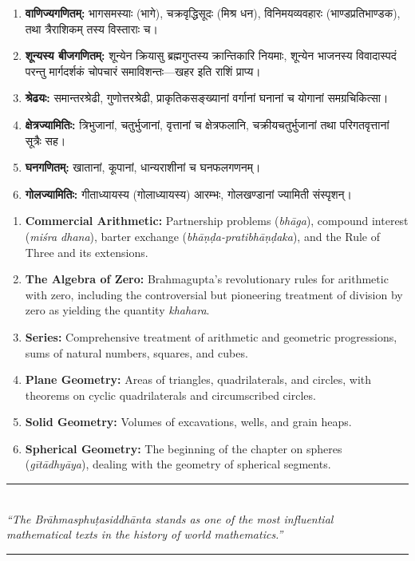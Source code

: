 \documentclass[10pt,a4paper]{article}
\newcommand{\dev}[1]{{\devanagarifont #1}}
\newcommand{\longline}{\noindent\rule{\textwidth}{0.4pt}}
\newcommand{\bilingual}[2]{%
  \noindent%
  \begin{minipage}[t]{0.47\textwidth}%
    \setstretch{1.15}#1%
  \end{minipage}%
  \hfill%
  \vrule\hfill%
  \begin{minipage}[t]{0.47\textwidth}%
    \setstretch{1.15}#2%
  \end{minipage}%
  \par\medskip
}
\begin{document}
\bilingual{%
\begin{enumerate}
\item \textbf{वाणिज्यगणितम्:} भागसमस्याः (\dev{भागे}), चक्रवृद्धिसूदः (\dev{मिश्र धन}), विनिमयव्यवहारः (\dev{भाण्डप्रतिभाण्डक}), तथा त्रैराशिकम् तस्य विस्ताराः च।
\item \textbf{शून्यस्य बीजगणितम्:} शून्येन क्रियासु ब्रह्मगुप्तस्य क्रान्तिकारि नियमाः, शून्येन भाजनस्य विवादास्पदं परन्तु मार्गदर्शकं चोपचारं समाविशन्तः---\dev{खहर} इति राशिं प्राप्य।
\item \textbf{श्रेढयः:} समान्तरश्रेढी, गुणोत्तरश्रेढी, प्राकृतिकसङ्ख्यानां वर्गानां घनानां च योगानां समग्रचिकित्सा।
\item \textbf{क्षेत्रज्यामितिः:} त्रिभुजानां, चतुर्भुजानां, वृत्तानां च क्षेत्रफलानि, चक्रीयचतुर्भुजानां तथा परिगतवृत्तानां सूत्रैः सह।
\item \textbf{घनगणितम्:} खातानां, कूपानां, धान्यराशीनां च घनफलगणनम्।
\item \textbf{गोलज्यामितिः:} गीताध्यायस्य (गोलाध्यायस्य) आरम्भः, गोलखण्डानां ज्यामिती संस्पृशन्।
\end{enumerate}
}{%
\begin{enumerate}
\item \textbf{Commercial Arithmetic:} Partnership problems (\textit{bhāga}), compound interest (\textit{miśra dhana}), barter exchange (\textit{bhāṇḍa-pratibhāṇḍaka}), and the Rule of Three and its extensions.
\item \textbf{The Algebra of Zero:} Brahmagupta's revolutionary rules for arithmetic with zero, including the controversial but pioneering treatment of division by zero as yielding the quantity \textit{khahara}.
\item \textbf{Series:} Comprehensive treatment of arithmetic and geometric progressions, sums of natural numbers, squares, and cubes.
\item \textbf{Plane Geometry:} Areas of triangles, quadrilaterals, and circles, with theorems on cyclic quadrilaterals and circumscribed circles.
\item \textbf{Solid Geometry:} Volumes of excavations, wells, and grain heaps.
\item \textbf{Spherical Geometry:} The beginning of the chapter on spheres (\textit{gītādhyāya}), dealing with the geometry of spherical segments.
\end{enumerate}
}

\vspace{1em}
\begin{center}
\longline\\[0.5em]
\textit{``The Brāhmasphuṭasiddhānta stands as one of the most influential}\\
\textit{mathematical texts in the history of world mathematics.''}\\[0.5em]
\longline
\end{center}
\end{document}
